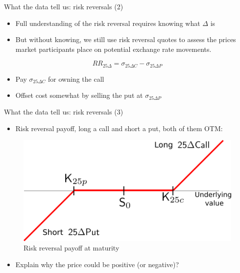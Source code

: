 \documentclass[ignorenonframetext,aspectratio=169]{beamer}
\providecommand{\tightlist}{%
  \setlength{\itemsep}{0pt}\setlength{\parskip}{0pt}}
\begin{document}
\begin{frame}{What the data tell us: risk reversals (2)}

\begin{itemize}
\tightlist
\item
  Full understanding of the risk reversal requires knowing what
  \(\Delta\) is
\item
  But without knowing, we still use risk reversal quotes to assess the
  prices market participants place on potential exchange rate movements.
\end{itemize}

\[
RR_{25\Delta} = \sigma_{25\Delta C} - \sigma_{25\Delta P}
\]

\begin{itemize}
\tightlist
\item
  Pay \(\sigma_{25\Delta C}\) for owning the call
\item
  Offset cost somewhat by selling the put at \(\sigma_{25\Delta P}\)
\end{itemize}

\end{frame}

\begin{frame}{What the data tell us: risk reversals (3)}

\begin{itemize}
\tightlist
\item
  Risk reversal payoff, long a call and short a put, both of them OTM:
\end{itemize}

\begin{figure}
\includegraphics[width=0.7\linewidth]{images/fig25RRSimple} \caption{Risk reversal payoff at maturity}\label{fig:unnamed-chunk-13}
\end{figure}

\begin{itemize}
\tightlist
\item
  Explain why the price could be positive (or negative)?
\end{itemize}

\end{frame}
\end{document}
